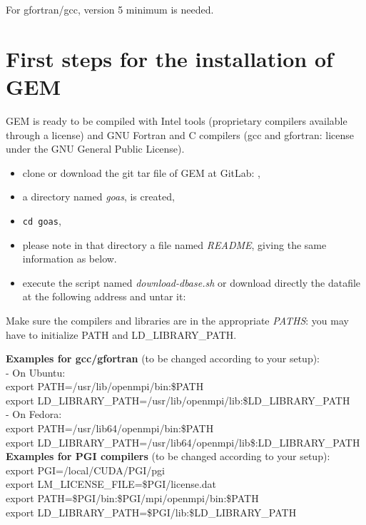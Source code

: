 \documentclass[11pt]{book}
\begin{document}
For gfortran/gcc, version 5 minimum is needed.

\section{First steps for the installation of GEM}
\label{compiling-gem}

GEM is ready to be compiled with Intel tools (proprietary compilers
available through a license) and GNU Fortran and C compilers (gcc and
gfortran: license under the GNU General Public License).

\begin{itemize} 
\item clone or download the git tar file of GEM at GitLab: ,
\item a directory named \textit{goas}, is created,
\item \texttt{cd goas},
\item please note in that directory a file named \textit{README}, giving the
  same information as below.
\item execute the script named \textit{download-dbase.sh} or download
  directly the datafile at the following address and untar it: \\ 
\end{itemize}

Make sure the compilers and libraries are in the appropriate \textit{PATHS}:
you may have to initialize PATH and LD\_LIBRARY\_PATH.

\textbf{Examples for gcc/gfortran} (to be changed according to your setup):\\
- On Ubuntu:\\
export PATH=/usr/lib/openmpi/bin:\${PATH}\\
export LD\_LIBRARY\_PATH=/usr/lib/openmpi/lib:\${LD\_LIBRARY\_PATH}\\
- On Fedora:\\
export PATH=/usr/lib64/openmpi/bin:\${PATH}\\
export LD\_LIBRARY\_PATH=/usr/lib64/openmpi/lib\$:{LD\_LIBRARY\_PATH}\\

\textbf{Examples for PGI compilers} (to be changed according to your setup):\\
export PGI=/local/CUDA/PGI/pgi\\
export LM\_LICENSE\_FILE=\$PGI/license.dat\\
export PATH=\$PGI/bin:\$PGI/mpi/openmpi/bin:\${PATH}\\
export LD\_LIBRARY\_PATH=\$PGI/lib:\${LD\_LIBRARY\_PATH}\\
\end{document}
